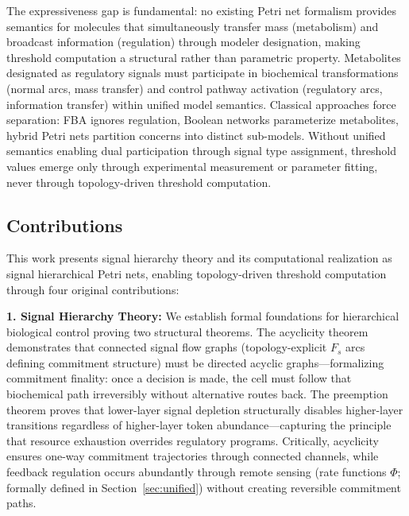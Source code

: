 \documentclass[10pt,letterpaper]{article}
\begin{document}
The expressiveness gap is fundamental: no existing Petri net formalism provides semantics for molecules that simultaneously transfer mass (metabolism) and broadcast information (regulation) through modeler designation, making threshold computation a structural rather than parametric property. Metabolites designated as regulatory signals must participate in biochemical transformations (normal arcs, mass transfer) and control pathway activation (regulatory arcs, information transfer) within unified model semantics. Classical approaches force separation: FBA ignores regulation, Boolean networks parameterize metabolites, hybrid Petri nets partition concerns into distinct sub-models. Without unified semantics enabling dual participation through signal type assignment, threshold values emerge only through experimental measurement or parameter fitting, never through topology-driven threshold computation.

\subsection{Contributions}

This work presents signal hierarchy theory and its computational realization as signal hierarchical Petri nets, enabling topology-driven threshold computation through four original contributions:

\textbf{1. Signal Hierarchy Theory:} We establish formal foundations for hierarchical biological control proving two structural theorems. The acyclicity theorem demonstrates that connected signal flow graphs (topology-explicit $F_s$ arcs defining commitment structure) must be directed acyclic graphs---formalizing commitment finality: once a decision is made, the cell must follow that biochemical path irreversibly without alternative routes back. The preemption theorem proves that lower-layer signal depletion structurally disables higher-layer transitions regardless of higher-layer token abundance---capturing the principle that resource exhaustion overrides regulatory programs. Critically, acyclicity ensures one-way commitment trajectories through connected channels, while feedback regulation occurs abundantly through remote sensing (rate functions $\Phi$; formally defined in Section~\ref{sec:unified}) without creating reversible commitment paths.
\end{document}
